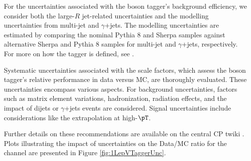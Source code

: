 \label{subsec:bkg_uncer_vtagger}

For the uncertainties associated with the boson tagger's background efficiency, we consider both the large-\(R\) jet-related uncertainties and the modelling uncertainties from multi-jet and $\gamma$+jets. 
The modelling uncertainties are estimated by comparing the nominal Pythia 8 and Sherpa samples against alternative Sherpa and Pythia 8 samples for multi-jet and $\gamma$+jets, respectively.
For more on how the tagger is defined, see \cite{ATL-PHYS-PUB-2020-017}.

Systematic uncertainties associated with the scale factors, which assess the boson tagger's relative performance in data versus MC, are thoroughly evaluated. 
These uncertainties encompass various aspects. For background uncertainties, factors such as matrix element variations, hadronization, radiation effects, and the impact of dijets or $\gamma$+jets events are considered. Signal uncertainties include considerations like the extrapolation at high-\(\pT\).

Further details on these recommendations are available on the central CP twiki \cite{JSSrecommendationSF}. Plots illustrating the impact of uncertainties on the Data/MC ratio for the \olep channel are presented in Figure \ref{fig:1LepVTaggerUnc}.

